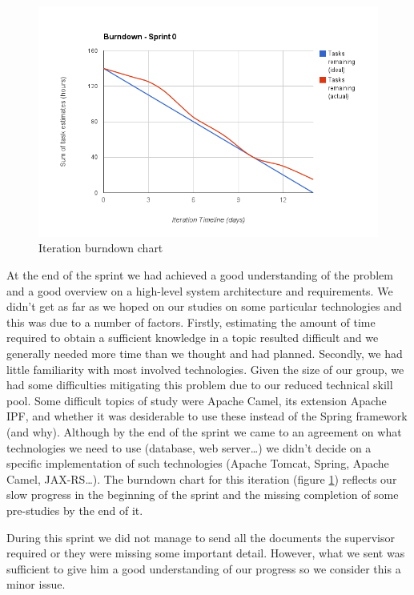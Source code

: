 \begin{figure}
\centering
\includegraphics[scale=0.60]{../Figures/burndownSprint0.png}
\caption{Iteration burndown chart}
\label{figure:burndownsprint0}
\end{figure}

At the end of the sprint we had achieved a good understanding of the problem and a good overview on a
high-level system architecture and requirements. We didn't get as far as we hoped on our studies on some particular
technologies and this was due to a number of factors. Firstly, estimating the amount of time required to obtain
a sufficient knowledge in a topic resulted difficult and we generally needed more time than we thought and had planned.
Secondly, we had little familiarity with most involved technologies.
Given the size of our group, we had some difficulties mitigating this problem due to
our reduced technical skill pool. Some difficult topics of study were Apache Camel, its extension Apache IPF,
and whether it was desiderable to use these instead of the Spring framework (and why).
Although by the end of the sprint we came to an agreement on what technologies we need to use
(database, web server\ldots) we didn't decide on a specific implementation of such technologies
(Apache Tomcat, Spring, Apache Camel, JAX-RS\ldots). The burndown chart for this iteration
(figure \ref{figure:burndownsprint0}) reflects our slow progress in the beginning of the sprint
and the missing completion of some pre-studies by the end of it.

During this sprint we did not manage to send all the documents the supervisor
required or they were missing some important detail. However, what we sent
was sufficient to give him a good understanding of our progress so we
consider this a minor issue.

